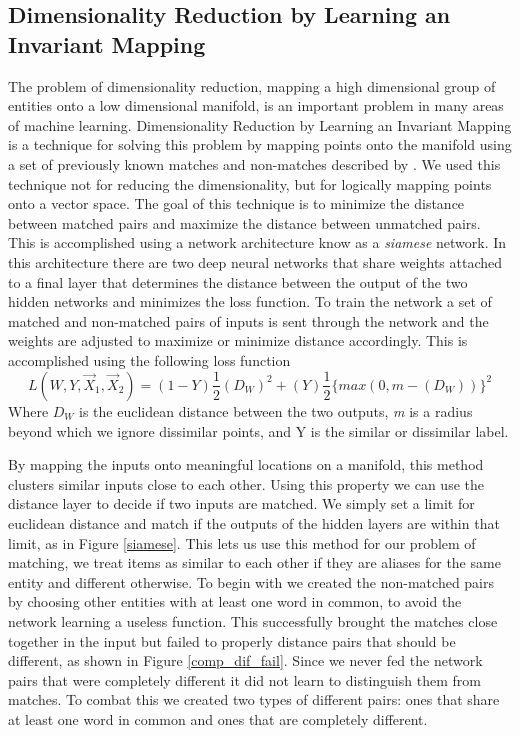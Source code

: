 \subsection{Dimensionality Reduction by Learning an Invariant Mapping}

The problem of dimensionality reduction, mapping a high dimensional group of entities onto a low dimensional manifold, is an important problem in many areas of machine learning. Dimensionality Reduction by Learning an Invariant Mapping is a technique for solving this problem by mapping points onto the manifold using a set of previously known matches and non-matches described by \cite{Hasdell:Siamese}. We used this technique not for reducing the dimensionality, but for logically mapping points onto a vector space. The goal of this technique is to minimize the distance between matched pairs and maximize the distance between unmatched pairs. This is accomplished using a network architecture know as a \textit{siamese} network. In this architecture there are two deep neural networks that share weights attached to a final layer that determines the distance between the output of the two hidden networks and minimizes the loss function. To train the network a set of matched and non-matched pairs of inputs is sent through the network and the weights are adjusted to maximize or minimize distance accordingly. This is accomplished using the following loss function \[ L(W, Y, \vec{X}_1, \vec{X}_2) = (1 - Y)\frac{1}{2}(D_W)^2 + (Y)\frac{1}{2}\{max(0, m - (D_W))\}^2\] Where \(D_W\) is the euclidean distance between the two outputs, \textit{m} is a radius beyond which we ignore dissimilar points, and Y is the similar or dissimilar label.

By mapping the inputs onto meaningful locations on a manifold, this method clusters similar inputs close to each other. Using this property we can use the distance layer to decide if two inputs are matched. We simply set a limit for euclidean distance and match if the outputs of the hidden layers are within that limit, as in Figure \ref{siamese}. This lets us use this method for our problem of matching, we treat items as similar to each other if they are aliases for the same entity and different otherwise. To begin with we created the non-matched pairs by choosing other entities with at least one word in common, to avoid the network learning a useless function. This successfully brought the matches close together in the input but failed to properly distance pairs that should be different, as shown in Figure \ref{comp_dif_fail}. Since we never fed the network pairs that were completely different it did not learn to distinguish them from matches. To combat this we created two types of different pairs: ones that share at least one word in common and ones that are completely different.

